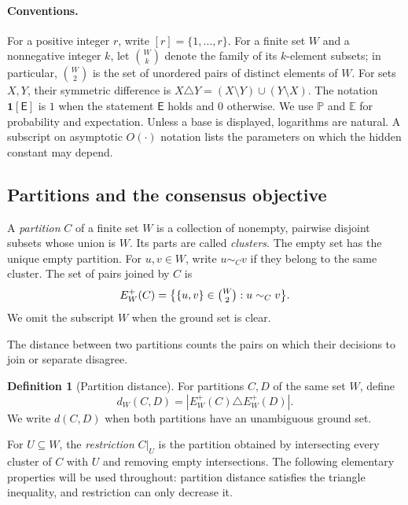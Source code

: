 \documentclass[11pt]{article}
\theoremstyle{definition}
\newtheorem{definition}[theorem]{Definition}
\theoremstyle{remark}
\newcommand{\1}{\mathbf{1}}
\newcommand{\E}{\mathbb{E}}
\newcommand{\Prb}{\mathbb{P}}
\begin{document}
\paragraph{Conventions.}
For a positive integer $r$, write $[r]=\{1,\ldots,r\}$.
For a finite set $W$ and a nonnegative integer $k$, let $\binom{W}{k}$
denote the family of its $k$-element subsets; in particular,
$\binom{W}{2}$ is the set of unordered pairs of distinct elements of $W$.
For sets $X,Y$, their symmetric difference is
$X\triangle Y=(X\setminus Y)\cup(Y\setminus X)$.
The notation $\1[\mathsf{E}]$ is $1$ when the statement $\mathsf{E}$ holds
and $0$ otherwise. We use $\Prb$ and $\E$ for probability and expectation.
Unless a base is displayed, logarithms are natural.
A subscript on asymptotic $O(\cdot)$ notation lists the parameters on
which the hidden constant may depend.

\subsection{Partitions and the consensus objective}\label{subsec:partitions}

A \emph{partition} $C$ of a finite set $W$ is a collection of nonempty,
pairwise disjoint subsets whose union is $W$. Its parts are called
\emph{clusters}. The empty set has the unique empty partition.
For $u,v\in W$, write $u\sim_C v$ if they belong to the same cluster.
The set of pairs joined by $C$ is
\[
  E_W^+(C)=\bigl\{\{u,v\}\in\tbinom{W}{2}:u\sim_C v\bigr\}.
\]
We omit the subscript $W$ when the ground set is clear.

The distance between two partitions counts the pairs on which their
decisions to join or separate disagree.

\begin{definition}[Partition distance]\label{def:partition-distance}
For partitions $C,D$ of the same set $W$, define
\begin{equation}\label{eq:partition-distance}
  d_W(C,D)=|E_W^+(C)\triangle E_W^+(D)|.
\end{equation}
We write $d(C,D)$ when both partitions have an unambiguous ground set.
\end{definition}

For $U\subseteq W$, the \emph{restriction} $C|_U$ is the partition obtained
by intersecting every cluster of $C$ with $U$ and removing empty
intersections. The following elementary properties will be used throughout:
partition distance satisfies the triangle inequality, and restriction can
only decrease it.
\end{document}
